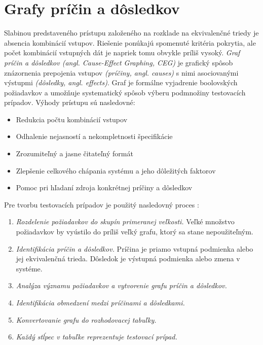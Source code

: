 \section{Grafy príčin a dôsledkov}
\label{ceg}
Slabinou predstaveného prístupu založeného na rozklade na ekvivalenčné triedy je absencia kombinácií vstupov. Riešenie ponúkajú spomenuté kritéria pokrytia, ale počet kombinácií vstupných dát je napriek tomu obvykle príliš vysoký. \textit{Graf príčin a dôsledkov (angl. Cause-Effect Graphing, CEG)} je grafický spôsob znázornenia prepojenia vstupov \textit{(príčiny, angl. causes)} s nimi asociovanými výstupmi \textit{(dôsledky, angl. effects)}. Graf je formálne vyjadrenie boolovských požiadavkov a umožňuje systematický spôsob výberu podmnožiny testovacích prípadov. 
Výhody prístupu sú nasledovné:
 \begin{itemize}
 	\item{ Redukcia počtu kombinácií vstupov
 	}
 	\item{ Odhalenie nejasností a nekompletnosti špecifikácie
 	}
 	\item{ Zrozumiteľný a jasne čitateľný formát
 	}
 	\item{ Zlepšenie celkového chápania systému a jeho dôležitých faktorov 
 	} 	
 	\item{ Pomoc pri hľadaní zdroja konkrétnej príčiny a dôsledkov  
 	} 	
 \end{itemize}
 Pre tvorbu testovacích prípadov je použitý nasledovný proces \cite{Ast}:
 \begin{enumerate}
 	\item{ \textit{Rozdelenie požiadavkov do skupín primeranej veľkosti.} Veľké množstvo požiadavkov by vyústilo do príliš veľký grafu, ktorý sa stane nepoužiteľným. 
 	}
 	\item{ \textit{Identifikácia príčin a dôsledkov.} Príčina je priamo vstupná podmienka alebo jej ekvivalenčná trieda. Dôsledok je výstupná podmienka alebo zmena v systéme.  
 	} 	
 	\item{ \textit{Analýza významu požiadavkov a vytvorenie grafu príčin a dôsledkov.} 
 	} 
 	\item{ \textit{Identifikácia obmedzení medzi príčinami a dôsledkami.} 
 	} 
 	\item{ \textit{Konvertovanie grafu do rozhodovacej tabuľky.} 
 	}  	
 	\item{ \textit{Každý stĺpec v tabuľke reprezentuje testovací prípad.}
 	}  		
 \end{enumerate}

